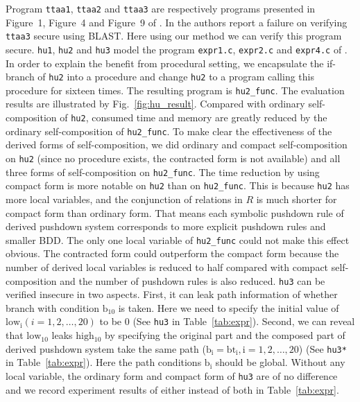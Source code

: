 \documentclass{llncs}
\begin{document}
Program \texttt{ttaa1}, \texttt{ttaa2} and \texttt{ttaa3} are
respectively programs presented in Figure~1, Figure~4 and Figure~9
of \cite{DBLP:conf/sas/TerauchiA05}. In
\cite{DBLP:conf/sas/TerauchiA05} the authors report a failure on
verifying \texttt{ttaa3} secure using BLAST. Here using our method
we can verify this program secure. \texttt{hu1}, \texttt{hu2} and
\texttt{hu3} model the program \texttt{expr1.c}, \texttt{expr2.c}
and \texttt{expr4.c} of \cite{DBLP:conf/pldi/UnnoKY06}. In order to
explain the benefit from procedural setting, we encapsulate the
\textrm{if}-branch of \texttt{hu2} into a procedure and change
\texttt{hu2} to a program calling this procedure for sixteen times.
The resulting program is \texttt{hu2\_func}. The evaluation results
are illustrated by Fig.~\ref{fig:hu_result}. Compared with ordinary
self-composition of \texttt{hu2}, consumed time and memory are
greatly reduced by the ordinary self-composition of
\texttt{hu2\_func}. To make clear the effectiveness of the derived
forms of self-composition, we did ordinary and compact
self-composition on \texttt{hu2} (since no procedure exists, the
contracted form is not available) and all three forms of
self-composition on \texttt{hu2\_func}. The time reduction by using
compact form is more notable on \texttt{hu2} than on
\texttt{hu2\_func}. This is because \texttt{hu2} has more local
variables, and the conjunction of relations in $R$ is much shorter
for compact form than ordinary form. That means each symbolic
pushdown rule of derived pushdown system corresponds to more
explicit pushdown rules and smaller BDD. The only one local variable
of \texttt{hu2\_func} could not make this effect obvious. The
contracted form could outperform the compact form because the number
of derived local variables is reduced to half compared with compact
self-composition and the number of pushdown rules is also reduced.
\texttt{hu3} can be verified insecure in two aspects. First, it can
leak path information of whether branch with condition
$\mathrm{b_{10}}$ is taken. Here we need to specify the initial
value of $\mathrm{low_i}(i=1,2,\ldots,20)$ to be 0 (See \texttt{hu3}
in Table~\ref{tab:expr}). Second, we can reveal that
$\mathrm{low_{10}}$ leaks $\mathrm{high_{10}}$ by specifying the
original part and the composed part of derived pushdown system take
the same path ($\mathrm{b_i=bt_i, i=1,2,\ldots,20}$) (See
\texttt{hu3*} in Table~\ref{tab:expr}). Here the path conditions
$\mathrm{b_i}$ should be global. Without any local variable, the
ordinary form and compact form of \texttt{hu3} are of no difference
and we record experiment results of either instead of both in
Table~\ref{tab:expr}.
\end{document}
